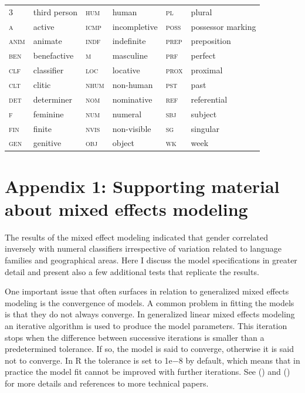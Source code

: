 \documentclass[output=collectionpaper]{langsci/langscibook}
\begin{document}
\begin{tabular}{llllll}
\textsc{3}	&	third person	&	\textsc{hum}	&	human	&	\textsc{pl}	&	plural	\\
\textsc{a}	&	active	&	\textsc{icmp}	&	incompletive	&	\textsc{poss}	&	possessor marking	\\
\textsc{anim}	&	animate	&	\textsc{indf}	&	indefinite	&	\textsc{prep}	&	preposition	\\
\textsc{ben}	&	benefactive	&	\textsc{m}	&	masculine	&	\textsc{prf}	&	perfect	\\
\textsc{clf}	&	classifier	&	\textsc{loc}	&	locative	&	\textsc{prox}	&	proximal	\\
\textsc{clt}	&	clitic	&	\textsc{nhum}	&	non-human	&	\textsc{pst}	&	past	\\
\textsc{det}	&	determiner	&	\textsc{nom}	&	nominative	&	\textsc{ref}	&	referential	\\
\textsc{f}	&	feminine	&	\textsc{num}	&	numeral	&	\textsc{sbj}	&	subject	\\
\textsc{fin}	&	finite	&	\textsc{nvis}	&	non-visible	&	\textsc{sg}	&	singular	\\
\textsc{gen}	&	genitive	&	\textsc{obj}	&	object	&	\textsc{wk}	&	week	\\

\end{tabular}


\section*{Appendix 1: Supporting material about mixed effects modeling}

The results of the mixed effect modeling indicated that gender correlated inversely with numeral classifiers irrespective of variation related to language families and geographical areas. Here I discuss the model specifications in greater detail and present also a few additional tests that replicate the results.

One important issue that often surfaces in relation to generalized mixed effects modeling is the convergence of models. A common problem in fitting the models is that they do not always converge. In generalized linear mixed effects modeling an iterative algorithm is used to produce the model parameters. This iteration stops when the difference between successive iterations is smaller than a predetermined tolerance. If so, the model is said to converge, otherwise it is said not to converge. In R the tolerance is set to 1e${-8}$ by default, which means that in practice the model fit cannot be improved with further iterations. See (\citealt[2, 9, 10, 31]{Hardin2007}) and (\citealt[3--4]{Kimballsubmitted}) for more details and references to more technical papers.
\end{document}
